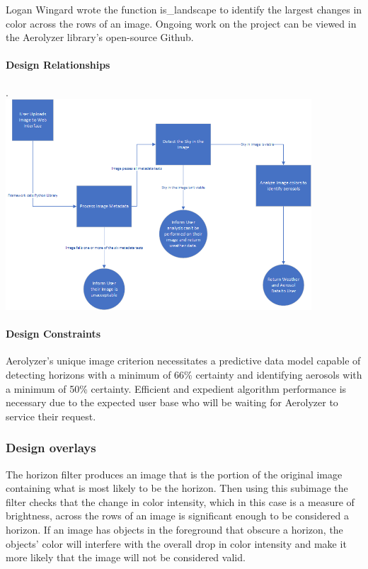\documentclass[onecolumn, draftclsnofoot,10pt, compsoc]{IEEEtran}
\begin{document}
\begin{singlespace}
				Logan Wingard wrote the function is_landscape to identify the largest changes in color across the rows of an image.
				Ongoing work on the project can be viewed in the Aerolyzer library’s open-source Github.

          \paragraph{Design Relationships}
					.\\
					\includegraphics[width=4.5in,natwidth=1907,natheight=787]{images/Design2.png}

          \paragraph{Design Constraints}
          		Aerolyzer’s unique image criterion necessitates a predictive data model capable of detecting horizons with a minimum of 66\% certainty and identifying aerosols with a minimum of 50\% certainty. Efficient and expedient algorithm performance is necessary due to the expected user base who will be waiting for Aerolyzer to service their request.
      
      \subsubsection{Design overlays}
		The horizon filter produces an image that is the portion of the original image containing what is most likely to be the horizon.
		Then using this subimage the filter checks that the change in color intensity, which in this case is a measure of brightness, across the rows of an image is significant enough to be considered a horizon.
		If an image has objects in the foreground that obscure a horizon, the objects' color will interfere with the overall drop in color intensity and make it more likely that the image will not be considered valid.
		

\end{singlespace}
\end{document}
